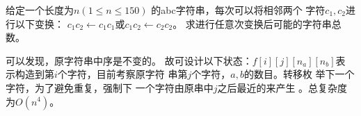 \begin{prob}
	给定一个长度为$n(1 \le n \le 150)$
	的abc字符串，每次可以将相邻两个
	字符$c_1,c_2$进行以下变换：
	$c_1c_2 \leftarrow c_1c_1$或$c_1c_2 \leftarrow c_2c_2$。
	求进行任意次变换后可能的字符串总数。
\end{prob}

\begin{sol}
	可以发现，原字符串中序是不变的。
	故可设计以下状态：$f[i][j][n_a][n_b]$表
	示构造到第$i$个字符，目前考察原字符
	串第$j$个字符，$a,b$的数目。转移枚
	举下一个字符，为了避免重复，强制下
	一个字符由原串中$j$之后最近的来产生
	。总复杂度为$O(n^4)$。
\end{sol}
